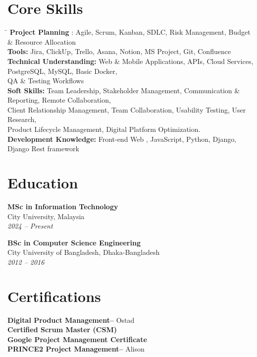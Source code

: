 \documentclass[a4paper,10pt]{article}
\begin{document}
\section*{Core Skills}
\begin{tabbing}
\hspace{3cm} \= \kill
\textbf{Project Planning} : Agile, Scrum, Kanban, SDLC, Risk Management, Budget \& Resource Allocation  \\
\textbf{Tools:} Jira, ClickUp, Trello, Asana, Notion, MS Project, Git, Confluence \\
\textbf{Technical Understanding:} Web \& Mobile Applications, APIs, Cloud Services, PostgreSQL, MySQL, Basic Docker, \\QA \& Testing Workflows\\
\textbf{Soft Skills:} Team Leadership, Stakeholder Management, Communication \& Reporting, Remote Collaboration,\\Client Relationship Management, Team Collaboration, Usability Testing, User Research,\\ Product Lifecycle Management, Digital Platform Optimization. \\
\textbf{Development Knowledge:} Front-end Web , JavaScript, Python, Django, Django Rest framework \\
\end{tabbing}

\section*{Education}
\textbf{MSc in Information Technology} \\
City University, Malaysia \\
\textit{2024 – Present}

\textbf{BSc in Computer Science Engineering} \\
City University of Bangladesh, Dhaka-Bangladesh \\
\textit{2012 – 2016}\\

\section*{Certifications}
\textbf{Digital Product Management–} Ostad \\
\textbf{Certified Scrum Master (CSM)}\\
\textbf{Google Project Management Certificate}\\
\textbf{PRINCE2 Project Management–} Alison \\
\end{document}

